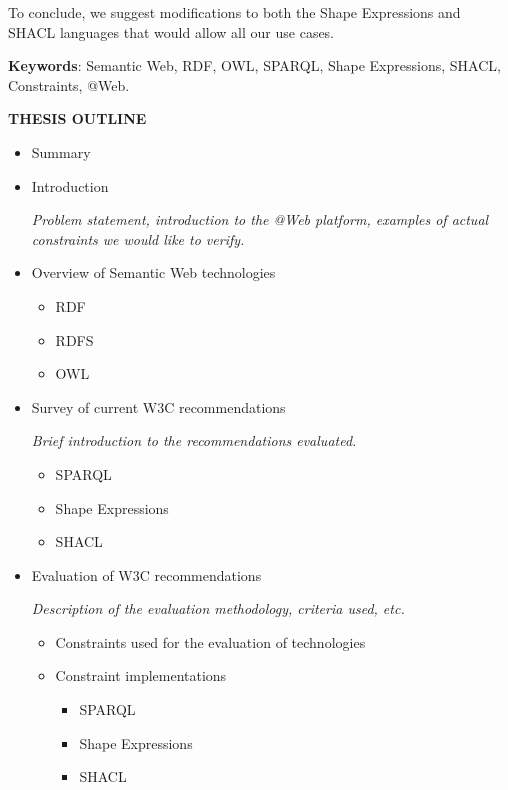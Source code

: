 \documentclass[a4paper, 10pt]{article}
\newcommand{\header}[1]{
  \begin{center}
    \textbf{\uppercase{#1}}
  \end{center}
  \vspace{-1em}
}
\begin{document}
To conclude, we suggest modifications to both the Shape Expressions and SHACL
languages that would allow all our use cases.

\textbf{Keywords}: Semantic Web, RDF, OWL, SPARQL, Shape Expressions, SHACL,
Constraints, @Web.


\newpage

\header{Thesis outline}

\begin{itemize}
  \item Summary

  \item Introduction

  \textit{Problem statement, introduction to the @Web platform, examples of
  actual constraints we would like to verify.}

  \item Overview of Semantic Web technologies

  \begin{itemize}
    \item RDF
    \item RDFS
    \item OWL
  \end{itemize}

  \item Survey of current W3C recommendations

  \textit{Brief introduction to the recommendations evaluated.}

  \begin{itemize}
    \item SPARQL
    \item Shape Expressions
    \item SHACL
  \end{itemize}

  \item Evaluation of W3C recommendations

  \textit{Description of the evaluation methodology, criteria used, etc.}

  \begin{itemize}
    \item Constraints used for the evaluation of technologies

    \item Constraint implementations

    \begin{itemize}
      \item SPARQL
      \item Shape Expressions
      \item SHACL
    \end{itemize}


\end{itemize}
\end{itemize}
\end{document}
